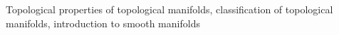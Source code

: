 Topological properties of topological manifolds, classification of topological manifolds, introduction to smooth manifolds